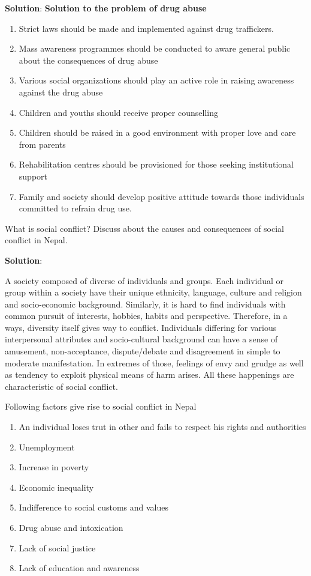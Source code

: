 \documentclass[
  openany]{book}
\newcommand{\question}{\item}
\newenvironment{solution}{ {\bfseries Solution}:}{}
\begin{document}
\begin{questions}
\begin{solution}
\textbf{Solution to the problem of drug abuse}
\begin{enumerate}
\item Strict laws should be made and implemented against drug traffickers.
\item Mass awareness programmes should be conducted to aware general public about the consequences of drug abuse
\item Various social organizations should play an active role in raising awareness against the drug abuse
\item Children and youths should receive proper counselling
\item Children should be raised in a good environment with proper love and care from parents
\item Rehabilitation centres should be provisioned for those seeking institutional support
\item Family and society should develop positive attitude towards those individuals committed to refrain drug use.
\end{enumerate}
\end{solution}

\question What is social conflict? Discuss about the causes and consequences of social conflict in Nepal.

\begin{solution}

A society composed of diverse of individuals and groups. Each individual or group within a society have their unique ethnicity, language, culture and religion and socio-economic background. Similarly, it is hard to find individuals with common pursuit of interests, hobbies, habits and perspective. Therefore, in a ways, diversity itself gives way to conflict. Individuals differing for various interpersonal attributes and socio-cultural background can have a sense of amusement, non-acceptance, dispute/debate and disagreement in simple to moderate manifestation. In extremes of those, feelings of envy and grudge as well as tendency to exploit physical means of harm arises. All these happenings are characteristic of social conflict.

Following factors give rise to social conflict in Nepal

\begin{enumerate}
\item An individual loses trut in other and fails to respect his rights and authorities
\item Unemployment
\item Increase in poverty
\item Economic inequality
\item Indifference to social customs and values
\item Drug abuse and intoxication
\item Lack of social justice
\item Lack of education and awareness
\end{enumerate}


\end{solution}
\end{questions}
\end{document}
